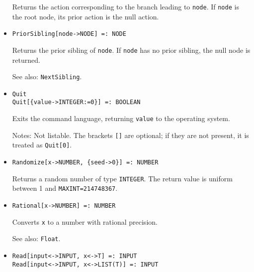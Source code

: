 \begin{itemize}
\bd
Returns the action corresponding to the branch leading to \verb+node+.
If \verb+node+ is the root node, its prior action is the null action.
\ed

\item{}
\protect \large \begin{verbatim}
PriorSibling[node->NODE] =: NODE 
\end{verbatim}\normalsize

\bd
Returns the prior sibling of \verb+node+.  If \verb+node+ has
no prior sibling, the null node is returned.
\item [See also:] \verb+NextSibling+.
\ed



\item{}
\protect \large \begin{verbatim}
Quit
Quit[{value->INTEGER:=0}] =: BOOLEAN
\end{verbatim}\normalsize

\bd
Exits the command language, returning \verb+value+ to the operating system.
\item [Notes:] Not listable.  The brackets \verb+[]+ are optional; if they
are not present, it is treated as \verb+Quit[0]+.
\ed


\item{}
\protect \large \begin{verbatim}
Randomize[x->NUMBER, {seed->0}] =: NUMBER
\end{verbatim}\normalsize

\bd 
Returns a random number of type \verb+INTEGER+.  The return value
is uniform between 1 and \verb+MAXINT=214748367+.  
\ed

\item{}
\protect \large \begin{verbatim}
Rational[x->NUMBER] =: NUMBER
\end{verbatim}\normalsize

\bd
Converts \verb+x+ to a number with rational precision.
\item [See also:] \verb+Float+.
\ed

\item{}
\protect \large \begin{verbatim}
Read[input<->INPUT, x<->T] =: INPUT 
Read[input<->INPUT, x<->LIST(T)] =: INPUT
\end{verbatim}\normalsize


\end{itemize}
